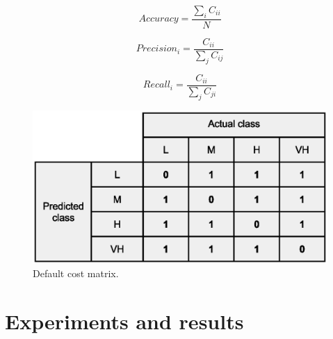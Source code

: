 \documentclass[a4paper,10pt,onecolumn,preprint,3p]{elsarticle}
\begin{document}
\begin{equation}
Accuracy=\frac{\sum_{i}C_{ii}}{N}
\label{equation:acc}
\end{equation}


\begin{equation}
Precision_{i}=\frac{C_{ii}}{\sum_{j}C_{ij}}
\label{equation:precision}
\end{equation}


\begin{equation}
Recall_{i}=\frac{C_{ii}}{\sum_{j}C_{ji}}
\label{equation:recall}
\end{equation}

\begin{figure}[ht]
\begin{center}
\includegraphics[scale=0.40]{Confusion-matrix-multiclass-default}
\end{center}
\caption{Default cost matrix.}
\label{fig:Default_cost_matrix}
\end{figure}




\section{Experiments and results}
\label{sec:experiments_results}

\end{document}
